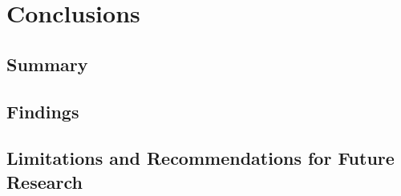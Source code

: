 \chapter{Conclusions}
\label{ch:conc}

\section{Summary}

\section{Findings}

\section{Limitations and Recommendations for Future Research}

